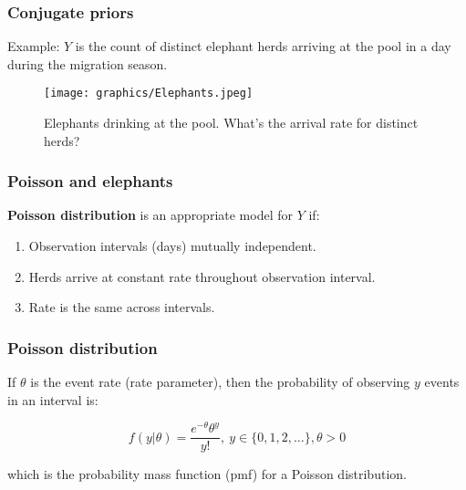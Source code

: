 \documentclass{beamer}
\newcommand{\1}{\ensuremath{\mathbf{1}}}
\begin{document}
%
%
%
\begin{frame}\frametitle{Conjugate priors}
	Example: $Y$ is the count of distinct elephant herds arriving at the pool in a day during the migration season.
	\begin{figure}
	\begin{center}
		\texttt{[image: graphics/Elephants.jpeg]}
	\end{center}
	\caption{Elephants drinking at the pool. What’s the arrival rate for distinct herds?}
	\end{figure}
\end{frame}
%
%
%
\begin{frame}\frametitle{Poisson and elephants}
	\textbf{Poisson distribution} is an appropriate model for $Y$ if:
	\begin{enumerate}
		\item Observation intervals (days) mutually independent.
		\item Herds arrive at constant rate throughout observation interval.
		\item Rate is the same across intervals. 
	\end{enumerate}
\end{frame}
%
%
%
\begin{frame}\frametitle{Poisson distribution}
	If $\theta$ is the event rate (rate parameter), then the probability of observing $y$ events in an interval is:
	\begin{block}{}
	\begin{equation}
		f(y|\theta) = \frac{e^{-\theta}\theta^y}{y!}, \: y \in \{0,1,2,\ldots\}, \theta > 0
	\end{equation}
	\end{block}
	which is the probability mass function (pmf) for a Poisson distribution.
\end{frame}
\end{document}
